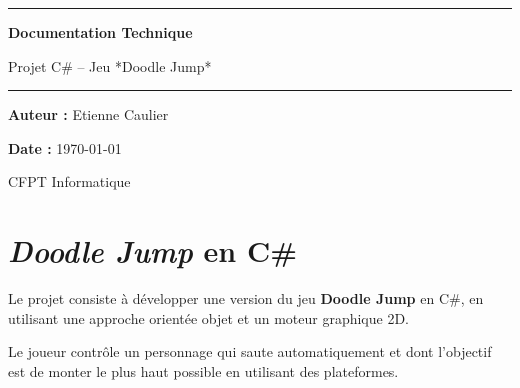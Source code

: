 \documentclass[french]{article}
\begin{document}
\begin{titlepage}
    \centering
    \vspace*{2cm}
    {\color{blue}\rule{\textwidth}{1.5pt}}\par
    \vspace{1cm}
    
    {\Huge\bfseries Documentation Technique\par}
    \vspace{0.5cm}
    {\Large Projet C\# – Jeu *Doodle Jump*\par}
    
    \vspace{1cm}
    {\color{blue}\rule{0.6\textwidth}{1pt}}\par
    \vspace{2cm}
    
    {\Large \textbf{Auteur :} Etienne Caulier \par}
    \vspace{0.5cm}
    {\Large \textbf{Date :} \today \par}
    
    \vfill
    
    
    \vspace{1cm}
    {\large CFPT Informatique \par}
    
    \vspace*{2cm}
\end{titlepage}


\tableofcontents
\newpage

\section{\textit{Doodle Jump} en C\#}
Le projet consiste à développer une version du jeu \textbf{Doodle Jump} en C\#, en utilisant une approche orientée objet et un moteur graphique 2D. \newline

Le joueur contrôle un personnage qui saute automatiquement et dont l’objectif est de monter le plus haut possible en utilisant des plateformes.
\end{document}
